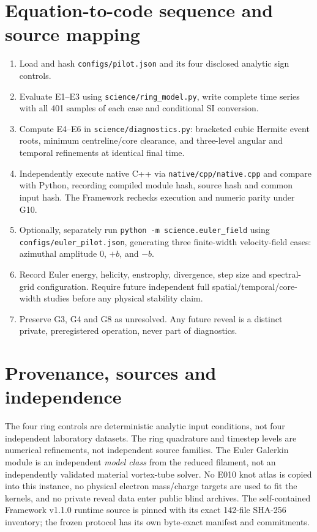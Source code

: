 \documentclass[10pt,a4paper]{article}
\begin{document}
\section{Equation-to-code sequence and source mapping}
\begin{enumerate}
\item Load and hash \texttt{configs/pilot.json} and its four disclosed analytic sign controls.
\item Evaluate E1--E3 using \texttt{science/ring\_model.py}, write complete time series with all 401 samples of each case and conditional SI conversion.
\item Compute E4--E6 in \texttt{science/diagnostics.py}: bracketed cubic Hermite event roots, minimum centreline/core clearance, and three-level angular and temporal refinements at identical final time.
\item Independently execute native C++ via \texttt{native/cpp/native.cpp} and compare with Python, recording compiled module hash, source hash and common input hash. The Framework rechecks execution and numeric parity under G10.
\item Optionally, separately run \texttt{python -m science.euler\_field} using \texttt{configs/euler\_pilot.json}, generating three finite-width velocity-field cases: azimuthal amplitude $0$, $+b$, and $-b$.
\item Record Euler energy, helicity, enstrophy, divergence, step size and spectral-grid configuration. Require future independent full spatial/temporal/core-width studies before any physical stability claim.
\item Preserve G3, G4 and G8 as unresolved. Any future reveal is a distinct private, preregistered operation, never part of diagnostics.
\end{enumerate}

\section{Provenance, sources and independence}
The four ring controls are deterministic analytic input conditions, not four independent laboratory datasets. The ring quadrature and timestep levels are numerical refinements, not independent source families. The Euler Galerkin module is an independent \emph{model class} from the reduced filament, not an independently validated material vortex-tube solver. No E010 knot atlas is copied into this instance, no physical electron mass/charge targets are used to fit the kernels, and no private reveal data enter public blind archives. The self-contained Framework v1.1.0 runtime source is pinned with its exact 142-file SHA-256 inventory; the frozen protocol has its own byte-exact manifest and commitments.
\end{document}
